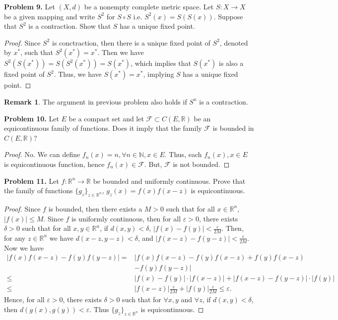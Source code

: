 \documentclass[12pt]{article}
\theoremstyle{definition}
\newtheorem{remark}{Remark}
\theoremstyle{definition}
\numberwithin{equation}{subsection}
\begin{document}
\medskip


\noindent
{\bf Problem 9.}
Let $(X,d)$ be a nonempty complete metric space.
Let $S:X\to X$ be a given mapping and write $S^2$ for
$S\circ S$ i.e. $S^2(x)=S(S(x))$. Suppose that $S^2$ is a
contraction. Show that $S$ has a unique fixed point.
\begin{proof}
Since $S^2$ is conctraction, then there is a unique fixed point of $S^2$, denoted by $x^*$, such that $S^2(x^*) = x^*$. Then we have $S^2(S(x^*)) = S\left(S^2(x^*)\right) = S(x^*)$, which implies that $S(x^*)$ is also a fixed point of $S^2$. Thus, we have $S(x^*) = x^*$, implying $S$ has a unique fixed point.
\end{proof}
\begin{remark}
The argument in previous problem also holds if $S^n$ is a contraction.
\end{remark}

\medskip


\noindent
{\bf Problem 10.}
Let $E$ be a compact set and
let $\mathcal{F}\subset C(E,\mathbb{R})$ be an equicontinuous family
of functions. Does it imply that the family $\mathcal{F}$
is bounded in $C(E,\mathbb{R})$?
\begin{proof}
No. We can define $f_n(x) = n, \forall n\in \mathbb{N}, x\in E$. Thus, each $f_n(x), x\in E$ is equicontinuous function, hence $f_n(x) \in \mathcal{F}$. But, $\mathcal{F}$ is not bounded.
\end{proof}

\medskip


\noindent
{\bf Problem 11.}
Let $f:\mathbb{R}^n\to\mathbb{R}$ be bounded and uniformly continuous.
Prove that the family of functions $\{ g_z\}_{z\in\mathbb{R}^n}$,
$g_z(x)=f(x)f(x-z)$ is equicontinuous.
\begin{proof}
Since $f$ is bounded, then there exists a $M > 0$ such that for all $x\in\mathbb{R}^n$, $|f(x)| \leq M$. Since $f$ is uniformly continuous, then for all $\varepsilon > 0$, there exists $\delta > 0$ such that for all $x,y\in \mathbb{R}^n$, if $d(x,y) < \delta$, $|f(x) - f(y)| < \frac{\varepsilon}{2M}$. Then, for any $z\in \mathbb{R}^n$ we have $d(x-z, y-z) < \delta$, and $|f(x-z) - f(y-z)| < \frac{\varepsilon}{2M}$. Now we have
\begin{align*}
    |f(x)f(x-z) - f(y)f(y-z)| = & |f(x)f(x-z) - f(y)f(x-z) + f(y)f(x-z) \\
    & - f(y)f(y-z)| \\
    \leq & |f(x) - f(y)| \cdot |f(x-z)| + |f(x-z) - f(y-z)| \cdot |f(y)| \\
    \leq &  |f(x-z)| \frac{\varepsilon}{2M} + |f(y)| \frac{\varepsilon}{2M} \leq \varepsilon.
\end{align*}
Hence, for all $\varepsilon > 0$, there exists $\delta > 0$ such that for $\forall x,y$ and $\forall z$, if $d(x,y) < \delta$, then $d(g(x), g(y)) < \varepsilon$. Thus $\{ g_z\}_{z\in\mathbb{R}^n}$ is equicontinuous.
\end{proof}
\end{document}
